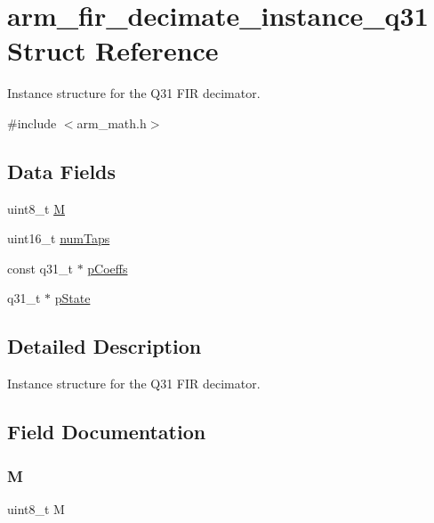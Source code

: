 \hypertarget{structarm__fir__decimate__instance__q31}{}\section{arm\+\_\+fir\+\_\+decimate\+\_\+instance\+\_\+q31 Struct Reference}
\label{structarm__fir__decimate__instance__q31}


Instance structure for the Q31 F\+IR decimator.  




{\ttfamily \#include $<$arm\+\_\+math.\+h$>$}

\subsection*{Data Fields}
\begin{DoxyCompactItemize}
\item 
uint8\+\_\+t \mbox{\hyperlink{structarm__fir__decimate__instance__q31_ae2c8107d00d3c9942e7a20fc598edecf}{M}}
\item 
uint16\+\_\+t \mbox{\hyperlink{structarm__fir__decimate__instance__q31_a751941891e47f522a7f5375fe8990aac}{num\+Taps}}
\item 
const q31\+\_\+t $\ast$ \mbox{\hyperlink{structarm__fir__decimate__instance__q31_a80e7fdf4747dbda8eadb2663fb4be317}{p\+Coeffs}}
\item 
q31\+\_\+t $\ast$ \mbox{\hyperlink{structarm__fir__decimate__instance__q31_adee4ba3ee8869865af7d8fa08ca913d6}{p\+State}}
\end{DoxyCompactItemize}


\subsection{Detailed Description}
Instance structure for the Q31 F\+IR decimator. 

\subsection{Field Documentation}
\mbox{\label{structarm__fir__decimate__instance__q31_ae2c8107d00d3c9942e7a20fc598edecf}} 
\subsubsection{\texorpdfstring{M}{M}}
{\footnotesize\ttfamily uint8\+\_\+t M}

